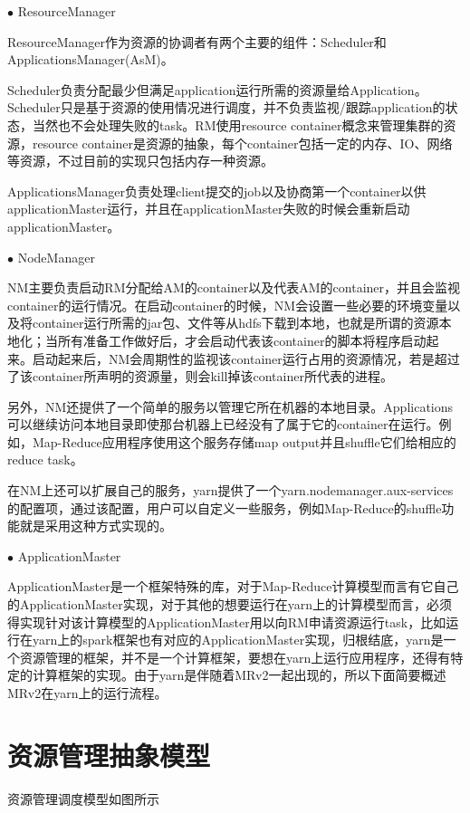 $\bullet$ ResourceManager

ResourceManager作为资源的协调者有两个主要的组件：Scheduler和ApplicationsManager(AsM)。

Scheduler负责分配最少但满足application运行所需的资源量给Application。Scheduler只是基于资源的使用情况进行调度，并不负责监视/跟踪application的状态，当然也不会处理失败的task。RM使用resource container概念来管理集群的资源，resource container是资源的抽象，每个container包括一定的内存、IO、网络等资源，不过目前的实现只包括内存一种资源。

ApplicationsManager负责处理client提交的job以及协商第一个container以供applicationMaster运行，并且在applicationMaster失败的时候会重新启动applicationMaster。

$\bullet$ NodeManager

NM主要负责启动RM分配给AM的container以及代表AM的container，并且会监视container的运行情况。在启动container的时候，NM会设置一些必要的环境变量以及将container运行所需的jar包、文件等从hdfs下载到本地，也就是所谓的资源本地化；当所有准备工作做好后，才会启动代表该container的脚本将程序启动起来。启动起来后，NM会周期性的监视该container运行占用的资源情况，若是超过了该container所声明的资源量，则会kill掉该container所代表的进程。

另外，NM还提供了一个简单的服务以管理它所在机器的本地目录。Applications可以继续访问本地目录即使那台机器上已经没有了属于它的container在运行。例如，Map-Reduce应用程序使用这个服务存储map output并且shuffle它们给相应的reduce task。

在NM上还可以扩展自己的服务，yarn提供了一个yarn.nodemanager.aux-services的配置项，通过该配置，用户可以自定义一些服务，例如Map-Reduce的shuffle功能就是采用这种方式实现的。

$\bullet$ ApplicationMaster

ApplicationMaster是一个框架特殊的库，对于Map-Reduce计算模型而言有它自己的ApplicationMaster实现，对于其他的想要运行在yarn上的计算模型而言，必须得实现针对该计算模型的ApplicationMaster用以向RM申请资源运行task，比如运行在yarn上的spark框架也有对应的ApplicationMaster实现，归根结底，yarn是一个资源管理的框架，并不是一个计算框架，要想在yarn上运行应用程序，还得有特定的计算框架的实现。由于yarn是伴随着MRv2一起出现的，所以下面简要概述MRv2在yarn上的运行流程。

\section{资源管理抽象模型}
 
资源管理调度模型如图所示

